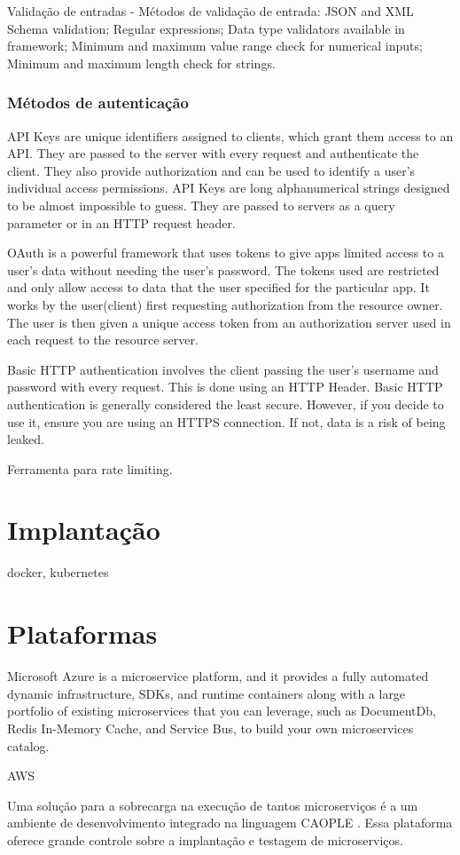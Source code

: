 Validação de entradas - Métodos de validação de entrada: JSON and XML Schema validation; Regular expressions;  Data type validators available in framework; Minimum and maximum value range check for numerical inputs;  Minimum and maximum length check for strings.

\subsubsection{Métodos de autenticação}

API Keys are unique identifiers assigned to clients, which grant them access to an API. They are passed to the server with every request and authenticate the client. They also provide authorization and can be used to identify a user's individual access permissions. API Keys are long alphanumerical strings designed to be almost impossible to guess. They are passed to servers as a query parameter or in an HTTP request header.

OAuth is a powerful framework that uses tokens to give apps limited access to a user’s data without needing the user’s password. The tokens used are restricted and only allow access to data that the user specified for the particular app. It works by the user(client) first requesting authorization from the resource owner. The user is then given a unique access token from an authorization server used in each request to the resource server.

Basic HTTP authentication involves the client passing the user’s username and password with every request. This is done using an HTTP Header. Basic HTTP authentication is generally considered the least secure. However, if you decide to use it, ensure you are using an HTTPS connection. If not, data is a risk of being leaked.

Ferramenta para rate limiting. \cite{rapidAPI-twitter}

\section{Implantação}

docker, kubernetes

\section{Plataformas}

Microsoft Azure is a microservice platform, and it provides a fully automated dynamic infrastructure, SDKs, and runtime containers along with a large portfolio of existing microservices that you can leverage, such as DocumentDb, Redis In-Memory Cache, and Service Bus, to build your own microservices catalog. \cite{Familiar2015}

AWS

Uma solução para a sobrecarga na execução de tantos microserviços é a um ambiente de desenvolvimento integrado na linguagem CAOPLE \cite{CAOPLE}. Essa plataforma oferece grande controle sobre a implantação e testagem de microserviços.